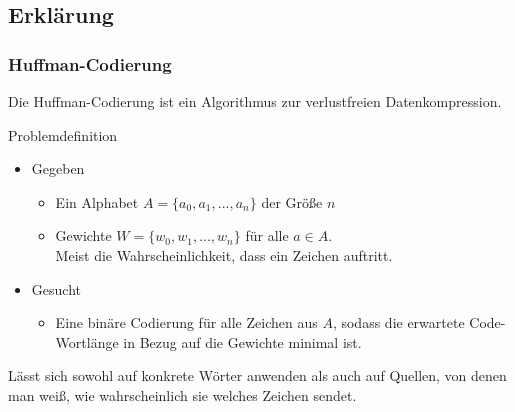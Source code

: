 \subsection{Erklärung}
\begin{frame}
	\frametitle{Huffman-Codierung}
	Die Huffman-Codierung ist ein Algorithmus zur verlustfreien Datenkompression.
	\begin{block}{Problemdefinition}
	\begin{itemize}
		\item Gegeben
		\begin{itemize}
			\item Ein Alphabet $A = \{a_0, a_1, ..., a_n\}$ der Größe $n$
			\item Gewichte $W = \{w_0, w_1, ..., w_n\}$ für alle $a \in A$. \\
			Meist die Wahrscheinlichkeit, dass ein Zeichen auftritt.
		\end{itemize}
		\item Gesucht
		\begin{itemize}
			\item Eine binäre Codierung für alle Zeichen aus $A$, sodass die erwartete Code-Wortlänge in Bezug auf die Gewichte minimal ist.
		\end{itemize}		
	\end{itemize}
	\end{block}
	 {
	Lässt sich sowohl auf konkrete Wörter anwenden als auch auf Quellen, von denen man weiß, wie wahrscheinlich sie welches Zeichen sendet.
	}
\end{frame}
